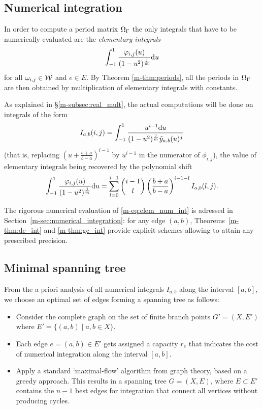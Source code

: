 \documentclass[main.tex]{subfiles}
\begin{document}
   \subsection{Numerical integration}\label{subsec:numerical_integration}

   In order to compute a period matrix $\Omega_{\Gamma}$ the only integrals that have to
   be numerically evaluated are
   the \emph{elementary integrals}
   \begin{equation}\label{eq:elem_ints}
       \int_{-1}^1 \frac{\varphi_{i,j}(u)}{(1-u^2)^{\frac{j}{m}}} \mathrm d u
   \end{equation}
   for all $\omega_{i,j} \in \mathcal{W}$ and $e \in E$. By Theorem \ref{m-thm:periods}, all the periods in $\Omega_{\Gamma}$ are
   then obtained by multiplication of elementary integrals with constants.

 As explained in \S \ref{m-subsec:real_mult}, the actual computations will be done on integrals of the form
\begin{equation}
    \label{eq:elem_num_int}
    I_{a,b}(i,j) = \int_{-1}^1\frac{u^{i-1}\mathrm d u}{(1-u^2)^{\frac jm}\tilde{y}_{a,b}(u)^j}
\end{equation}
(that is, replacing $(u+\frac{b+a}{b-a})^{i-1}$ by $u^{i-1}$ in the numerator of $\phi_{i,j}$),
the value of elementary integrals being recovered by the polynomial shift
\begin{equation}
    \label{eq:polshift}
    \int_{-1}^1\frac{\varphi_{i,j}(u)}{(1-u^2)^{\frac jm}}\mathrm d u
    = \sum_{l=0}^{i-1} {i-1 \choose l} \left(\frac{b+a}{b-a}\right)^{i-1-l} I_{a,b}(l,j).
\end{equation}

The rigorous numerical evaluation of \eqref{m-eq:elem_num_int} is
adressed in Section~\ref{m-sec:numerical_integration}: for any edge $(a,b)$,
Theorems~\ref{m-thm:de_int} and \ref{m-thm:gc_int} provide
explicit schemes allowing to attain any prescribed precision.

  \subsection{Minimal spanning tree}\label{subsec:spanning_tree}


  From the a priori analysis of all numerical integrals $I_{a,b}$ along
  the interval $[a,b]$, we choose an optimal set of edges forming a spanning tree as follows:
  \begin{itemize}
      \item
   Consider the complete graph on the set of finite branch points $G' = (X,E')$ where
   $E' = \{  (a,b)  \mid  a,b \in X \}$.
      \item
   Each edge $e = (a,b) \in E'$ gets assigned a capacity $r_e$ that indicates
   the cost of numerical integration along the interval $[a,b]$.
   \item
   Apply a standard `maximal-flow' algorithm from graph theory, based on a greedy approach.
   This results in a spanning tree $G = (X,E)$, where $E \subset E'$ contains the $n-1$ best edges
   for integration that connect all vertices without producing cycles.
  \end{itemize}
\end{document}
